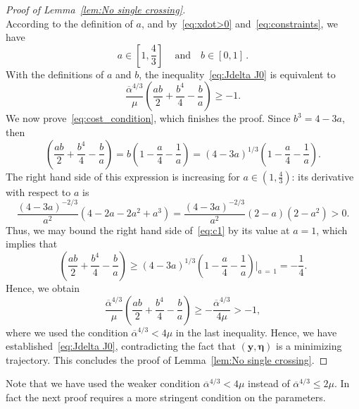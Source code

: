 \documentclass[AHL,Unicode,longabstracts]{cedram}
\newcommand{\by}{\mathbf{y}}
\newcommand{\beeta}{\boldsymbol{\eta}}
\newcommand{\1}{\mathds{1}}
\begin{document}
\begin{proof}[Proof of Lemma~\ref{lem:No single crossing}]
\begin{equation*}
\end{equation*}
According to the definition of $a$, and by~\eqref{eq:xdot>0} and~\eqref{eq:constraints}, we have
\[
a\in \left[1,\frac{4}{3}\right]\, \quad \text{and}\quad b\in [0,1]\,.
\]
With the definitions of $a$ and $b$, the inequality~\eqref{eq:Jdelta J0} is equivalent to
\begin{equation}\label{eq:cost_condition}
\frac{\overline \alpha^{4/3}}{\mu} \left (\dfrac{a b}{2} + \dfrac{b^4}{4} - \dfrac{b }{a}\right)\geq - 1.
\end{equation}
We now prove~\eqref{eq:cost_condition}, which finishes the proof. Since $b^3 = 4 - 3a$, then
\begin{equation}\label{eq:c1}
\left (\frac{a b}{2} + \frac{b^4}{4} - \frac{b }{a}\right) = b \left(1 - \frac{a}{4} - \frac{1}{a}\right) = (4 - 3a)^{1/3}\left(1 - \frac{a}{4} - \frac{1}{a}\right).
\end{equation}
The right hand side of this expression is increasing for $a\in (1,\frac43)$: its derivative with respect to $a$ is
\begin{equation*}
\frac{\left(4 - 3 a\right)^{-2/3}}{a^2}\left (4 - 2 a - 2 a^2 + a^3 \right) = \frac{\left (4 - 3 a\right)^{-2/3}}{a^2} (2-a)\left(2-a^2\right) > 0.
\end{equation*}
Thus, we may bound the right hand side of~\eqref{eq:c1} by its value at $a=1$, which implies that
\[
\left (\frac{a b}{2} + \frac{b^4}{4} - \frac{b }{a}\right)
\geq \left(4 - 3 a\right)^{1/3} \left(1 - \frac{a}{4} - \frac{1}{a}\right){\bigg|}_{a\,=\,1} = -\frac{1}{4}.
\]
Hence, we obtain
\[
\frac{\overline \alpha^{4/3}}{\mu}\left(\frac{a b}{2} + \frac{b^4}{4} - \frac{b }{a}\right)
\geq -\frac{\overline \alpha^{4/3}}{4\mu} > -1,
\]
where we used the condition $\overline\alpha^{4/3} < 4 \mu$ in the last inequality. Hence, we have established~\eqref{eq:Jdelta J0}, contradicting the fact that $(\by,\beeta)$ is a minimizing trajectory. This concludes the proof of Lemma~\ref{lem:No single crossing}.
\end{proof}

Note that we have used the weaker condition $\overline\alpha^{4/3} < 4 \mu$ instead of $\overline\alpha^{4/3} \leq 2 \mu$. In fact the next proof requires a more stringent condition on the parameters.
\end{document}

